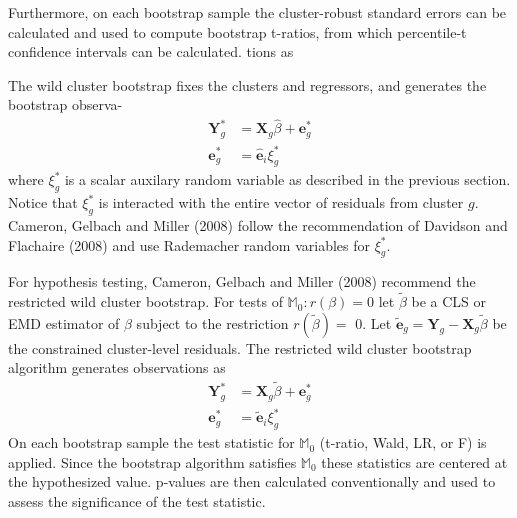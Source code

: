 \documentclass[10pt]{article}
\begin{document}
Furthermore, on each bootstrap sample the cluster-robust standard errors can be calculated and used to compute bootstrap t-ratios, from which percentile-t confidence intervals can be calculated. tions as

The wild cluster bootstrap fixes the clusters and regressors, and generates the bootstrap observa-
$$
\begin{aligned}
\boldsymbol{Y}_{g}^{*} &=\boldsymbol{X}_{g} \widehat{\beta}+\boldsymbol{e}_{g}^{*} \\
\boldsymbol{e}_{g}^{*} &=\widehat{\boldsymbol{e}}_{i} \xi_{g}^{*}
\end{aligned}
$$
where $\xi_{g}^{*}$ is a scalar auxilary random variable as described in the previous section. Notice that $\xi_{g}^{*}$ is interacted with the entire vector of residuals from cluster $g$. Cameron, Gelbach and Miller (2008) follow the recommendation of Davidson and Flachaire (2008) and use Rademacher random variables for $\xi_{g}^{*}$.

For hypothesis testing, Cameron, Gelbach and Miller (2008) recommend the restricted wild cluster bootstrap. For tests of $\mathbb{M}_{0}: r(\beta)=0$ let $\widetilde{\beta}$ be a CLS or EMD estimator of $\beta$ subject to the restriction $r(\widetilde{\beta})=$ 0. Let $\widetilde{\boldsymbol{e}}_{g}=\boldsymbol{Y}_{g}-\boldsymbol{X}_{g} \widetilde{\beta}$ be the constrained cluster-level residuals. The restricted wild cluster bootstrap algorithm generates observations as
$$
\begin{aligned}
\boldsymbol{Y}_{g}^{*} &=\boldsymbol{X}_{g} \widetilde{\beta}+\boldsymbol{e}_{g}^{*} \\
\boldsymbol{e}_{g}^{*} &=\widetilde{\boldsymbol{e}}_{i} \xi_{g}^{*}
\end{aligned}
$$
On each bootstrap sample the test statistic for $\mathbb{M}_{0}$ (t-ratio, Wald, LR, or F) is applied. Since the bootstrap algorithm satisfies $\mathbb{M}_{0}$ these statistics are centered at the hypothesized value. p-values are then calculated conventionally and used to assess the significance of the test statistic.
\end{document}
